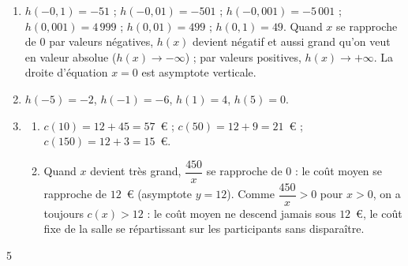 {\begin{enumerate}
\item $h(-0{,}1)=-51$ ; $h(-0{,}01)=-501$ ; $h(-0{,}001)=-5\,001$ ; $h(0{,}001)=4\,999$ ; $h(0{,}01)=499$ ; $h(0{,}1)=49$. Quand $x$ se rapproche de $0$ par valeurs négatives, $h(x)$ devient négatif et aussi grand qu'on veut en valeur absolue ($h(x)\to-\infty$) ; par valeurs positives, $h(x)\to+\infty$. La droite d'équation $x=0$ est asymptote verticale.
\item $h(-5)=-2$, $h(-1)=-6$, $h(1)=4$, $h(5)=0$.
\begin{center}
\end{center}
\item
\begin{enumerate}[label=\alph*.]
\item $c(10)=12+45=57$~€ ; $c(50)=12+9=21$~€ ; $c(150)=12+3=15$~€.
\item Quand $x$ devient très grand, $\dfrac{450}{x}$ se rapproche de $0$ : le coût moyen se rapproche de $12$~€ (asymptote $y=12$). Comme $\dfrac{450}{x}>0$ pour $x>0$, on a toujours $c(x)>12$ : le coût moyen ne descend jamais sous $12$~€, le coût fixe de la salle se répartissant sur les participants sans disparaître.
\end{enumerate}
\end{enumerate}
}{5}

